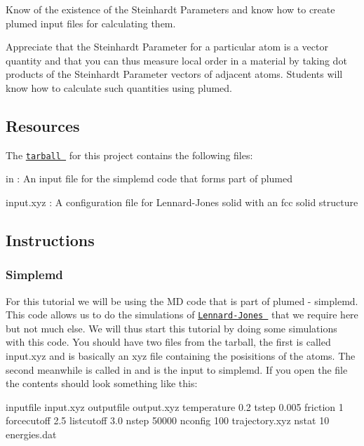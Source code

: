 \begin{DoxyItemize}
\item Know of the existence of the Steinhardt Parameters and know how to create plumed input files for calculating them.
\item Appreciate that the Steinhardt Parameter for a particular atom is a vector quantity and that you can thus measure local order in a material by taking dot products of the Steinhardt Parameter vectors of adjacent atoms. Students will know how to calculate such quantities using plumed.
\end{DoxyItemize}\hypertarget{belfast-10_Resources}{}\subsection{Resources}\label{belfast-10_Resources}
The \href{tutorial-resources/belfast-9b.tar.gz}{\tt tarball } for this project contains the following files\+:


\begin{DoxyItemize}
\item in \+: An input file for the simplemd code that forms part of plumed
\item input.\+xyz \+: A configuration file for Lennard-\/\+Jones solid with an fcc solid structure
\end{DoxyItemize}\hypertarget{belfast-10_Instructions}{}\subsection{Instructions}\label{belfast-10_Instructions}
\hypertarget{belfast-10_Simplemd}{}\subsubsection{Simplemd}\label{belfast-10_Simplemd}
For this tutorial we will be using the M\+D code that is part of plumed -\/ simplemd. This code allows us to do the simulations of \href{http://en.wikipedia.org/wiki/Lennard-Jones_potential}{\tt Lennard-\/\+Jones } that we require here but not much else. We will thus start this tutorial by doing some simulations with this code. You should have two files from the tarball, the first is called input.\+xyz and is basically an xyz file containing the posisitions of the atoms. The second meanwhile is called in and is the input to simplemd. If you open the file the contents should look something like this\+:

\begin{DoxyVerb}inputfile input.xyz
outputfile output.xyz
temperature 0.2
tstep 0.005
friction 1
forcecutoff 2.5
listcutoff  3.0
nstep 50000
nconfig 100 trajectory.xyz
nstat   10 energies.dat
\end{DoxyVerb}


